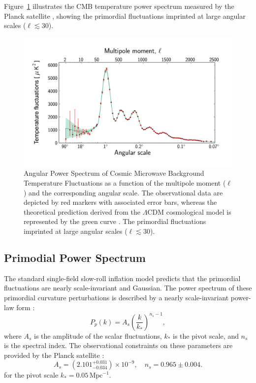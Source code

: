 Figure~\ref{fig:cmb_power_spectrum} illustrates the CMB temperature power spectrum measured by the Planck satellite \citep{2014A&A...571A..15P}, showing the primordial fluctuations imprinted at large angular scales (\( \ell \lesssim 30 \)).
\begin{figure}[ht]
    \centering
    \includegraphics[width=\textwidth]{figures/Planck_power_spectrum.jpg}
    \caption[Angular Power Spectrum of CMB Temperature]{Angular Power Spectrum of Cosmic Microwave Background Temperature Fluctuations as a function of the multipole moment (\( \ell \)) and the corresponding angular scale. The observational data are depicted by red markers with associated error bars, whereas the theoretical prediction derived from the \(\Lambda\)CDM cosmological model is represented by the green curve \citep{2014A&A...571A..15P}. The primordial fluctuations imprinted at large angular scales (\( \ell \lesssim 30 \)).
    }
    \label{fig:cmb_power_spectrum}
\end{figure}

\subsection{Primodial Power Spectrum}
The standard single-field slow-roll inflation model predicts that the primordial fluctuations are nearly scale-invariant and Gaussian. The power spectrum of these primordial curvature perturbations is described by a nearly scale-invariant power-law form \citep{2003moco.book.....D}:
\begin{equation}
    P_p(k) = A_s \left(\frac{k}{k_*}\right)^{n_s - 1},
\end{equation}
where $A_s$ is the amplitude of the scalar fluctuations, $k_*$ is the pivot scale, and $n_s$ is the spectral index. The observational constraints on these parameters are provided by the Planck satellite \citep{2020A&A...641A...6P}:
\begin{equation}
    A_s = (2.101^{+0.031}_{-0.034}) \times 10^{-9}, \quad n_s = 0.965 \pm 0.004.
\end{equation}
for the pivot scale \( k_* = 0.05 \, \text{Mpc}^{-1} \).

